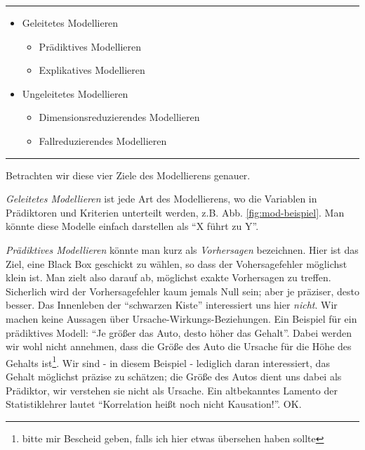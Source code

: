 \documentclass[12pt,ngerman,]{book}
\providecommand{\tightlist}{%
  \setlength{\itemsep}{0pt}\setlength{\parskip}{0pt}}
\let\rmarkdownfootnote\footnote%
\def\footnote{\protect\rmarkdownfootnote}
\theoremstyle{definition}
\theoremstyle{definition}
\theoremstyle{remark}
\begin{document}
\begin{center}\rule{0.5\linewidth}{\linethickness}\end{center}

\begin{itemize}
\tightlist
\item
  Geleitetes Modellieren

  \begin{itemize}
  \tightlist
  \item
    Prädiktives Modellieren
  \item
    Explikatives Modellieren
  \end{itemize}
\item
  Ungeleitetes Modellieren

  \begin{itemize}
  \tightlist
  \item
    Dimensionsreduzierendes Modellieren
  \item
    Fallreduzierendes Modellieren
  \end{itemize}
\end{itemize}

\begin{center}\rule{0.5\linewidth}{\linethickness}\end{center}

Betrachten wir diese vier Ziele des Modellierens genauer.

\emph{Geleitetes Modellieren} ist jede Art
des Modellierens, wo die Variablen in Prädiktoren und Kriterien
unterteilt werden, z.B. Abb. \ref{fig:mod-beispiel}. Man könnte diese
Modelle einfach darstellen als ``X führt zu Y''.

\emph{Prädiktives Modellieren} könnte man
kurz als \emph{Vorhersagen} bezeichnen. Hier ist das
Ziel, eine Black Box geschickt zu wählen, so dass der Vohersagefehler
möglichst klein ist. Man zielt also darauf ab, möglichst exakte
Vorhersagen zu treffen. Sicherlich wird der Vorhersagefehler kaum jemals
Null sein; aber je präziser, desto besser. Das Innenleben der
``schwarzen Kiste'' interessiert uns hier \emph{nicht}. Wir machen keine
Aussagen über Ursache-Wirkungs-Beziehungen. Ein Beispiel für ein
prädiktives Modell: ``Je größer das Auto, desto höher das Gehalt''.
Dabei werden wir wohl nicht annehmen, dass die Größe des Auto die
Ursache für die Höhe des Gehalts ist\footnote{bitte mir Bescheid geben,
  falls ich hier etwas übersehen haben sollte}. Wir sind - in diesem
Beispiel - lediglich daran interessiert, das Gehalt möglichst präzise zu
schätzen; die Größe des Autos dient uns dabei als Prädiktor, wir
verstehen sie nicht als Ursache. Ein altbekanntes Lamento der
Statistiklehrer lautet ``Korrelation heißt noch nicht Kausation!''. OK.
\end{document}
